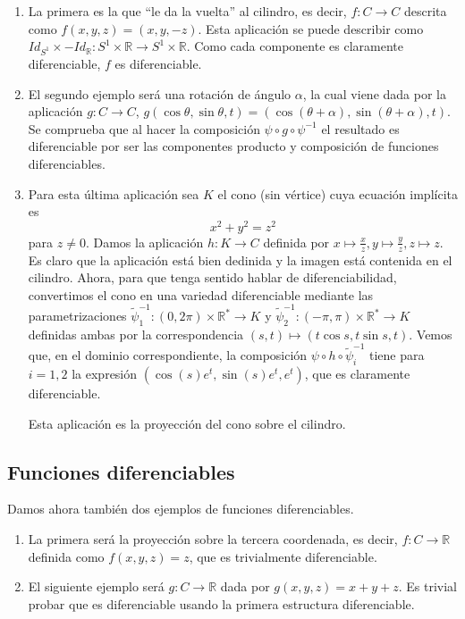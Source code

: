 \documentclass[twoside, 11pt]{article}
\theoremstyle{definition}
\newcommand{\R}{\mathbb{R}}
\begin{document}
\begin{enumerate}


\item La primera es la que ``le da la vuelta'' al cilindro, es decir, $f:C\to C$ descrita como $f(x,y,z)=(x,y,-z)$. Esta aplicación se puede describir como $Id_{S^1}\times -Id_{\R}:S^1\times\R\to S^1\times\R$. Como cada componente es claramente diferenciable, $f$ es diferenciable. 

\item El segundo ejemplo será una rotación de ángulo $\alpha$, la cual viene dada por la aplicación $g:C\to C$, $g(\cos\theta,\sin\theta, t)=(\cos(\theta+\alpha), \sin(\theta+\alpha), t)$. Se comprueba que al hacer la composición $\psi\circ g\circ \psi^{-1}$ el resultado es diferenciable por ser las componentes producto y composición de funciones diferenciables. 

\item Para esta última aplicación sea $K$ el cono (sin vértice) cuya ecuación implícita es $$x^2+y^2=z^2$$ para $z\neq 0$. Damos la aplicación $h:K\to C$ definida por $x\mapsto \frac{x}{z}, y\mapsto \frac{y}{z}, z\mapsto z$. Es claro que la aplicación está bien dedinida y la imagen está contenida en el cilindro. Ahora, para que tenga sentido hablar de diferenciabilidad, convertimos el cono en una variedad diferenciable mediante las parametrizaciones $\widetilde{\psi}_1^{-1}:(0,2\pi)\times\R^*\to K$ y $\widetilde{\psi}_2^{-1}:(-\pi,\pi)\times\R^*\to K$ definidas ambas por la correspondencia $(s,t)\mapsto (t\cos s, t\sin s, t)$. Vemos que, en el dominio correspondiente, la composición $\psi\circ h\circ \widetilde{\psi}_i^{-1}$ tiene para $i=1,2$  la expresión $(\cos(s)e^t, \sin(s)e^t, e^t)$, que es claramente diferenciable. 

Esta aplicación es la proyección del cono sobre el cilindro. 


\end{enumerate}

\subsection{Funciones diferenciables}

Damos ahora también dos ejemplos de funciones diferenciables. 

\begin{enumerate}


\item
 La primera será la proyección sobre la tercera coordenada, es decir, $f:C\to\R$ definida como $f(x,y,z)=z$, que es trivialmente diferenciable. 

\item
 El siguiente ejemplo será $g:C\to\R$ dada por $g(x,y,z)=x+y+z$. Es trivial probar que es diferenciable usando la primera estructura diferenciable. 

\end{enumerate}
\end{document}
